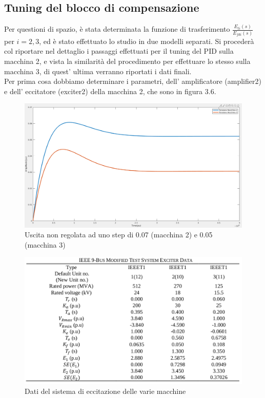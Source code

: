\documentclass[Lau,noexaminfo]{sapthesis}
\begin{document}
	\subsection{Tuning del blocco di compensazione}
	Per questioni di spazio, è stata determinata la funzione di trasferimento $\frac{E_{ti}(s)}{E_{fdi}(s)}$ per $i=2,3$, ed è stato effettuato lo studio in due modelli separati. Si procederà col riportare nel dettaglio i passaggi effettuati per il tuning del PID sulla macchina 2, e vista la similarità del procedimento per effettuare lo stesso sulla macchina 3, di quest' ultima verranno riportati i dati finali.\\
	Per prima cosa dobbiamo determinare i parametri, dell' amplificatore (amplifier2) e dell' eccitatore (exciter2) della macchina 2, che sono in figura 3.6.
	\begin{figure}
	\centering
	\includegraphics[height=0.35\textheight]{Sistema_non_regolato}
	\caption{Uscita non regolata ad uno step di 0.07 (macchina 2) e 0.05 (macchina 3)}
	\end{figure}	
	\begin{figure}
	 	\centering
	 	\includegraphics[height=0.3\textheight]{Dati_Sistema_Eccitazione}	 	\caption{Dati del sistema di eccitazione delle varie macchine}
	\end{figure}
\end{document}

